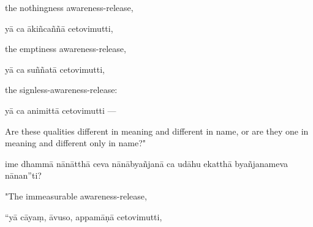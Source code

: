 \begin{samepage}
\begin{leftcolumn*}
the nothingness awareness-release,
\end{leftcolumn*}

\begin{rightcolumn}
yā ca ākiñcaññā cetovimutti,
\end{rightcolumn}
\end{samepage}

\begin{samepage}
\begin{leftcolumn*}
the emptiness awareness-release,
\end{leftcolumn*}

\begin{rightcolumn}
yā ca suññatā cetovimutti,
\end{rightcolumn}
\end{samepage}

\begin{samepage}
\begin{leftcolumn*}
the signless-awareness-release:
\end{leftcolumn*}

\begin{rightcolumn}
yā ca animittā cetovimutti —
\end{rightcolumn}
\end{samepage}

\begin{samepage}
\begin{leftcolumn*}
Are these qualities different in meaning and different in name, or are they one in meaning and different only in name?"
\end{leftcolumn*}

\begin{rightcolumn}
ime dhammā nānātthā ceva nānābyañjanā ca udāhu ekatthā byañjanameva nānan”ti?
\end{rightcolumn}
\end{samepage}

\begin{samepage}
\begin{leftcolumn*}
"The immeasurable awareness-release,
\end{leftcolumn*}

\begin{rightcolumn}
“yā cāyaṃ, āvuso, appamāṇā cetovimutti,
\end{rightcolumn}
\end{samepage}

